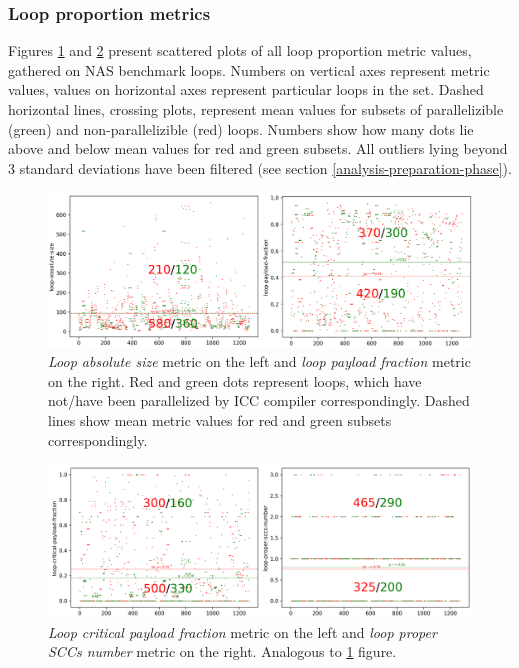 \subsubsection{Loop proportion metrics}
\label{analysis-loop-proportion-metrics}
\qquad Figures \ref{loop-proportions-0} and \ref{loop-proportions-1} present scattered plots of all loop proportion metric values, gathered on NAS benchmark loops. Numbers on vertical axes represent metric values, values on horizontal axes represent particular loops in the set. Dashed horizontal lines, crossing plots, represent mean values for subsets of parallelizible (green) and non-parallelizible (red) loops. Numbers show how many dots lie above and below mean values for red and green subsets. All outliers lying beyond 3 standard deviations have been filtered (see section \ref{analysis-preparation-phase}). 
\begin{figure}[htb]
\centering
\includegraphics[width=\linewidth]{figs/loop-proportions-0.png}
\caption{\textit{Loop absolute size} metric on the left and \textit{loop payload fraction} metric on the right. Red and green dots represent loops, which have not/have been parallelized by ICC compiler correspondingly. Dashed lines show mean metric values for red and green subsets correspondingly.}
\label{loop-proportions-0}
\end{figure}
\begin{figure}[htb]
\centering
\includegraphics[width=\linewidth]{figs/loop-proportions-1.png}
\caption{\textit{Loop critical payload fraction} metric on the left and \textit{loop proper SCCs number} metric on the right. Analogous to \ref{loop-proportions-0} figure.}
\label{loop-proportions-1}
\end{figure} \newline
